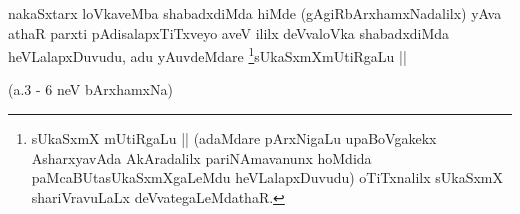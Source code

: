 \begin{artha}
nakaSxtarx loVkaveMba shabadxdiMda hiMde (gAgiRbArxhamxNadalilx) yAva
athaR parxti pAdisalapxTiTxveyo aveV ililx deVvaloVka shabadxdiMda
heVLalapxDuvudu, adu yAuvdeMdare \footnote[1]{sUkaSxmX mUtiRgaLu ||
(adaMdare pArxNigaLu upaBoVgakekx AsharxyavAda AkAradalilx
pariNAmavanunx hoMdida paMcaBUtasUkaSxmXgaLeMdu heVLalapxDuvudu)
oTiTxnalilx sUkaSxmX shariVravuLaLx deVvategaLeMdathaR.}sUkaSxmXmUtiRgaLu ||
\end{artha}

(a.3 - 6 neV bArxhamxNa)  
